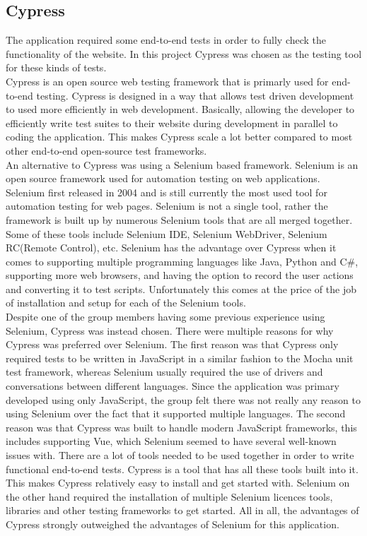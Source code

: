 \subsection{Cypress}
The application required some end-to-end tests in order to fully check the functionality of the website. In this project Cypress was chosen as the testing tool for these kinds of tests.
\\[11pt]
Cypress\cite{Cypress:MainPage,Cypress:howItWorks} is an open source web testing framework that is primarly used for end-to-end testing. Cypress is designed in a way that allows test driven development to used more efficiently in web development. Basically, allowing the developer to efficiently write test suites to their website during development in parallel to coding the application. This makes Cypress scale a lot better compared to most other end-to-end open-source test frameworks.
\\[11pt]
An alternative to Cypress was using a Selenium based framework. Selenium\cite{Selenium:Intro,Selenium:Wiki} is an open source framework used for automation testing on web applications. Selenium first released in 2004 and is still currently the most used tool for automation testing for web pages. Selenium is not a single tool, rather the framework is built up by numerous Selenium tools that are all merged together. Some of these tools include Selenium IDE, Selenium WebDriver, Selenium RC(Remote Control), etc. Selenium has the advantage over Cypress when it comes to supporting multiple programming languages like Java, Python and C\#, supporting more web browsers, and having the option to record the user actions and converting it to test scripts. Unfortunately this comes at the price of the job of installation and setup for each of the Selenium tools.
\\[11pt]
Despite one of the group members having some previous experience using Selenium, Cypress was instead chosen. There were multiple reasons for why Cypress was preferred over Selenium. The first reason was that Cypress only required tests to be written in JavaScript in a similar fashion to the Mocha unit test framework, whereas Selenium usually required the use of drivers and conversations between different languages. Since the application was primary developed using only JavaScript, the group felt there was not really any reason to using Selenium over the fact that it supported multiple languages. The second reason was that Cypress was built to handle modern JavaScript frameworks, this includes supporting Vue, which Selenium seemed to have several well-known issues with. There are a lot of tools needed to be used together in order to write functional end-to-end tests. Cypress is a tool that has all these tools built into it. This makes Cypress relatively easy to install and get started with. Selenium on the other hand required the installation of multiple Selenium licences tools, libraries and other testing frameworks to get started. All in all, the advantages of Cypress strongly outweighed the advantages of Selenium for this application.\cite{CypressVsSelenium}
